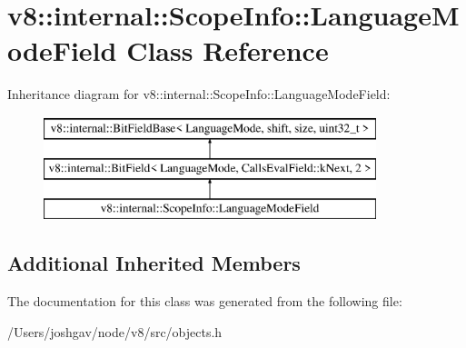 \hypertarget{classv8_1_1internal_1_1_scope_info_1_1_language_mode_field}{}\section{v8\+:\+:internal\+:\+:Scope\+Info\+:\+:Language\+Mode\+Field Class Reference}
\label{classv8_1_1internal_1_1_scope_info_1_1_language_mode_field}
Inheritance diagram for v8\+:\+:internal\+:\+:Scope\+Info\+:\+:Language\+Mode\+Field\+:\begin{figure}[H]
\begin{center}
\leavevmode
\includegraphics[height=3.000000cm]{classv8_1_1internal_1_1_scope_info_1_1_language_mode_field}
\end{center}
\end{figure}
\subsection*{Additional Inherited Members}


The documentation for this class was generated from the following file\+:\begin{DoxyCompactItemize}
\item 
/\+Users/joshgav/node/v8/src/objects.\+h\end{DoxyCompactItemize}
